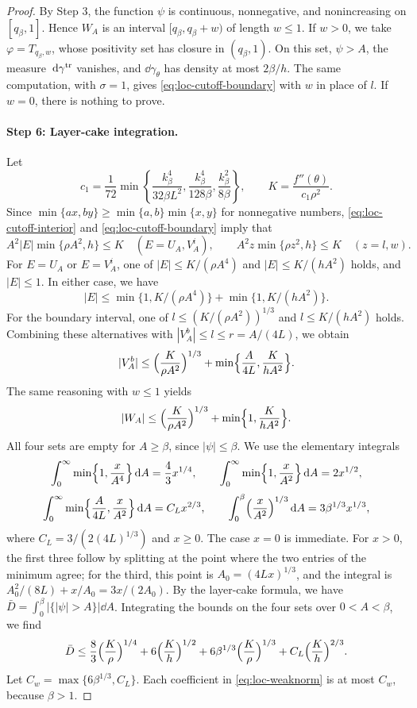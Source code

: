 \begin{proof}
By Step 3, the function $\psi$ is continuous, nonnegative, and nonincreasing on
$[q_\beta,1]$. Hence $W_A$ is an interval $[q_\beta,q_\beta+w)$ of length
$w\le1$.
If $w>0$, we take $\varphi=T_{q_\beta,w}$, whose positivity set has closure in
$(q_\beta,1)$. On this set, $\psi>A$, the measure $\,\mathrm d\gamma^{\rm tr}$ vanishes,
and $\dd\gamma_\theta$ has density at most $2\beta/h$. The same computation,
with $\sigma=1$, gives \eqref{eq:loc-cutoff-boundary} with $w$ in place of
$l$. If $w=0$, there is nothing to prove.

\paragraph{Step 6: Layer-cake integration.}
Let
\[
 c_1=\frac1{72}\min\left\{\frac{k_\beta^4}{32\beta L^2},
                         \frac{k_\beta^4}{128\beta},
                         \frac{k_\beta^2}{8\beta}\right\},\qquad
 K=\frac{f''(\theta)}{c_1\rho^2}.
\]
Since $\min\{ax,by\}\ge\min\{a,b\}\min\{x,y\}$ for nonnegative numbers,
\eqref{eq:loc-cutoff-interior} and \eqref{eq:loc-cutoff-boundary} imply that
\[
 A^2|E|\min\{\rho A^2,h\}\le K\quad(E=U_A,V_A^i),\qquad
 A^2z\min\{\rho z^2,h\}\le K\quad(z=l,w).
\]
For $E=U_A$ or $E=V_A^i$, one of $|E|\le K/(\rho A^4)$ and $|E|\le K/(hA^2)$
holds, and $|E|\le1$. In either case, we have
\[
 |E|\le\min\{1,K/(\rho A^4)\}+\min\{1,K/(hA^2)\}.
\]
For the boundary interval, one of $l\le(K/(\rho A^2))^{1/3}$ and
$l\le K/(hA^2)$ holds. Combining these alternatives with $|V_A^b|\le l\le
r=A/(4L)$, we obtain
\[
 |V_A^b|\le\Bigl(\frac K{\rho A^2}\Bigr)^{1/3}
 +\min\Bigl\{\frac A{4L},\frac K{hA^2}\Bigr\}.
\]
The same reasoning with $w\le1$ yields
\[
 |W_A|\le\Bigl(\frac K{\rho A^2}\Bigr)^{1/3}+\min\Bigl\{1,\frac K{hA^2}\Bigr\}.
\]
All four sets are empty for $A\ge\beta$, since $|\psi|\le\beta$. We use the
elementary integrals
\[
 \int_0^\infty\min\Bigl\{1,\frac x{A^4}\Bigr\}\,\mathrm d A=\frac43x^{1/4},\qquad
 \int_0^\infty\min\Bigl\{1,\frac x{A^2}\Bigr\}\,\mathrm d A=2x^{1/2},
\]
\[
 \int_0^\infty\min\Bigl\{\frac A{4L},\frac x{A^2}\Bigr\}\,\mathrm d A=C_Lx^{2/3},\qquad
 \int_0^\beta\Bigl(\frac x{A^2}\Bigr)^{1/3}\,\mathrm d A=3\beta^{1/3}x^{1/3},
\]
where $C_L=3/(2(4L)^{1/3})$ and $x\ge0$. The case $x=0$ is immediate. For
$x>0$, the first three follow by splitting
at the point where the two entries of the minimum agree; for the third, this
point is $A_0=(4Lx)^{1/3}$, and the integral is
$A_0^2/(8L)+x/A_0=3x/(2A_0)$. By the layer-cake formula, we have
$\bar D=\int_0^\beta|\{|\psi|>A\}|\dd A$. Integrating the bounds on the four
sets over $0<A<\beta$, we find
\begin{equation}\label{eq:loc-weaknorm}
 \bar D\le\frac83\Bigl(\frac K\rho\Bigr)^{1/4}+6\Bigl(\frac Kh\Bigr)^{1/2}
 +6\beta^{1/3}\Bigl(\frac K\rho\Bigr)^{1/3}+C_L\Bigl(\frac Kh\Bigr)^{2/3}.
\end{equation}
Let $C_w=\max\{6\beta^{1/3},C_L\}$. Each coefficient in
\eqref{eq:loc-weaknorm} is at most $C_w$, because $\beta>1$.


\end{proof}
